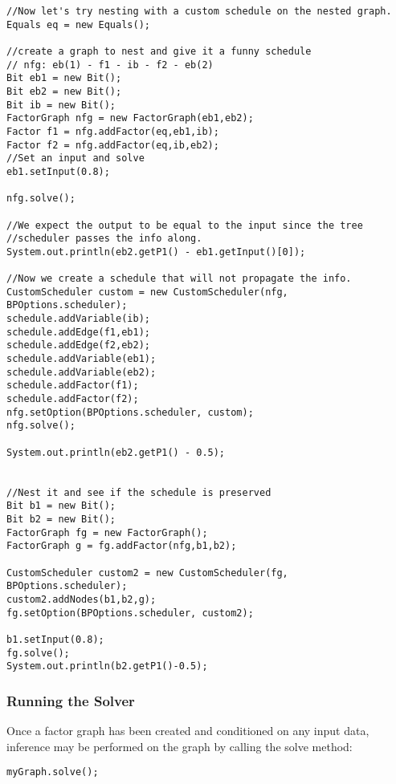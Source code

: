 \fi

\ifjava

\begin{lstlisting}
//Now let's try nesting with a custom schedule on the nested graph.
Equals eq = new Equals();
	
//create a graph to nest and give it a funny schedule    
// nfg: eb(1) - f1 - ib - f2 - eb(2)
Bit eb1 = new Bit();
Bit eb2 = new Bit();
Bit ib = new Bit();
FactorGraph nfg = new FactorGraph(eb1,eb2);
Factor f1 = nfg.addFactor(eq,eb1,ib);
Factor f2 = nfg.addFactor(eq,ib,eb2);
//Set an input and solve
eb1.setInput(0.8);

nfg.solve();

//We expect the output to be equal to the input since the tree
//scheduler passes the info along.
System.out.println(eb2.getP1() - eb1.getInput()[0]);

//Now we create a schedule that will not propagate the info.
CustomScheduler custom = new CustomScheduler(nfg, BPOptions.scheduler);
schedule.addVariable(ib);
schedule.addEdge(f1,eb1);
schedule.addEdge(f2,eb2);
schedule.addVariable(eb1);
schedule.addVariable(eb2);
schedule.addFactor(f1);
schedule.addFactor(f2);
nfg.setOption(BPOptions.scheduler, custom);
nfg.solve();

System.out.println(eb2.getP1() - 0.5);

		
//Nest it and see if the schedule is preserved
Bit b1 = new Bit();
Bit b2 = new Bit();
FactorGraph fg = new FactorGraph();
FactorGraph g = fg.addFactor(nfg,b1,b2);

CustomScheduler custom2 = new CustomScheduler(fg, BPOptions.scheduler);
custom2.addNodes(b1,b2,g);
fg.setOption(BPOptions.scheduler, custom2);

b1.setInput(0.8);		
fg.solve();
System.out.println(b2.getP1()-0.5);

\end{lstlisting}

\fi

\subsubsection{Running the Solver}

Once a factor graph has been created and conditioned on any input data, inference may be performed on the graph by calling the solve method:

\begin{lstlisting}
myGraph.solve();
\end{lstlisting}

